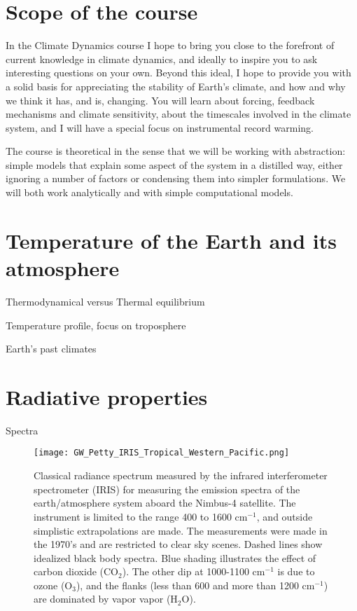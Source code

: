 \documentclass[12pt]{book}
\begin{document}
\section{Scope of the course}
In the Climate Dynamics course I hope to bring you close to the forefront of current knowledge in climate dynamics, and ideally to inspire you to ask interesting questions on your own. Beyond this ideal, I hope to provide you with a solid basis for appreciating the stability of Earth's climate, and how and why we think it has, and is, changing. You will learn about forcing, feedback mechanisms and climate sensitivity, about the timescales involved in the climate system, and I will have a special focus on instrumental record warming. 

The course is theoretical in the sense that we will be working with abstraction: simple models that explain some aspect of the system in a distilled way, either ignoring a number of factors or condensing them into simpler formulations. We will both work analytically and with simple computational models. 


\section{Temperature of the Earth and its atmosphere}



Thermodynamical versus Thermal equilibrium

Temperature profile, focus on troposphere

Earth's past climates

\section{Radiative properties}

Spectra

\begin{figure}
\begin{center}
\texttt{[image: GW\_Petty\_IRIS\_Tropical\_Western\_Pacific.png]}
\end{center}
\caption{ Classical radiance spectrum measured by the infrared interferometer spectrometer (IRIS) for measuring the emission spectra of the earth/atmosphere system aboard the Nimbus-4 satellite. The instrument is limited to the range 400 to 1600 cm$^{-1}$, and outside simplistic extrapolations are made. The measurements were made in the 1970's and are restricted to clear sky scenes. Dashed lines show idealized black body spectra. Blue shading illustrates the effect of carbon dioxide (CO$_2$). The other dip at 1000-1100 cm$^{-1}$ is due to ozone (O$_3$), and the flanks (less than 600 and more than 1200 cm$^{-1}$) are dominated by vapor vapor (H$_2$O). } 
\label{fig:radiation_spectrum}
\end{figure}
\end{document}
